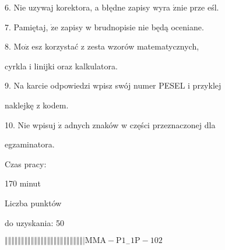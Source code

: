 \documentclass[a4paper,12pt]{article}
\begin{document}
6. Nie uzywaj korektora, a błędne zapisy wyra $\acute{\mathrm{z}}\mathrm{n}\mathrm{i}\mathrm{e}$ prze eśl.

7. Pamiętaj, $\dot{\mathrm{z}}\mathrm{e}$ zapisy w brudnopisie nie będą oceniane.

8. $\mathrm{M}\mathrm{o}\dot{\mathrm{z}}$ esz korzystać z zesta wzorów matematycznych,

cyrkla i linijki oraz kalkulatora.

9. Na karcie odpowiedzi wpisz swój numer PESEL i przyklej

naklejkę z kodem.

10. Nie wpisuj $\dot{\mathrm{z}}$ adnych znaków w części przeznaczonej dla

egzaminatora.

Czas pracy:

170 minut

Liczba punktów

do uzyskania: 50

$\Vert\Vert\Vert\Vert\Vert\Vert\Vert\Vert\Vert\Vert\Vert\Vert\Vert\Vert\Vert\Vert\Vert\Vert\Vert\Vert\Vert\Vert\Vert\Vert|  \mathrm{M}\mathrm{M}\mathrm{A}-\mathrm{P}1_{-}1\mathrm{P}-102$
\end{document}
